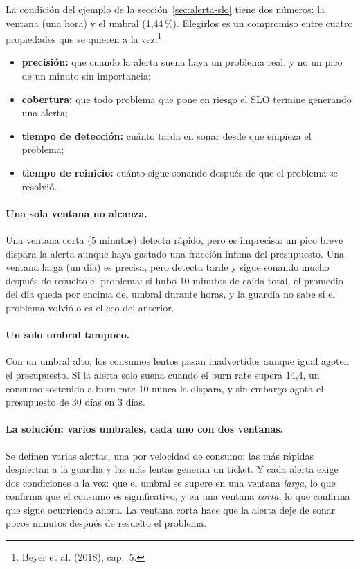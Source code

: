 \documentclass[variant=apuntes,cover=institutional,mode=screen]{ua-engineering-v6-article}
\begin{document}
La condición del ejemplo de la sección~\ref{sec:alerta-slo} tiene dos números: la ventana (una hora) y el umbral (1,44\,\%). Elegirlos es un compromiso entre cuatro propiedades que se quieren a la vez:\footnote{Beyer et al. (2018), cap.~5.}
\begin{itemize}
\item \textbf{precisión:} que cuando la alerta suena haya un problema real, y no un pico de un minuto sin importancia;
\item \textbf{cobertura:} que todo problema que pone en riesgo el SLO termine generando una alerta;
\item \textbf{tiempo de detección:} cuánto tarda en sonar desde que empieza el problema;
\item \textbf{tiempo de reinicio:} cuánto sigue sonando después de que el problema se resolvió.
\end{itemize}

\paragraph{Una sola ventana no alcanza.} Una ventana corta (5 minutos) detecta rápido, pero es imprecisa: un pico breve dispara la alerta aunque haya gastado una fracción ínfima del presupuesto. Una ventana larga (un día) es precisa, pero detecta tarde y sigue sonando mucho después de resuelto el problema: si hubo 10 minutos de caída total, el promedio del día queda por encima del umbral durante horas, y la guardia no sabe si el problema volvió o es el eco del anterior.

\paragraph{Un solo umbral tampoco.} Con un umbral alto, los consumos lentos pasan inadvertidos aunque igual agoten el presupuesto. Si la alerta solo suena cuando el burn rate supera 14,4, un consumo sostenido a burn rate 10 nunca la dispara, y sin embargo agota el presupuesto de 30 días en 3 días.

\paragraph{La solución: varios umbrales, cada uno con dos ventanas.} Se definen varias alertas, una por velocidad de consumo: las más rápidas despiertan a la guardia y las más lentas generan un ticket. Y cada alerta exige dos condiciones a la vez: que el umbral se supere en una ventana \emph{larga}, lo que confirma que el consumo es significativo, y en una ventana \emph{corta}, lo que confirma que sigue ocurriendo ahora. La ventana corta hace que la alerta deje de sonar pocos minutos después de resuelto el problema.
\end{document}
